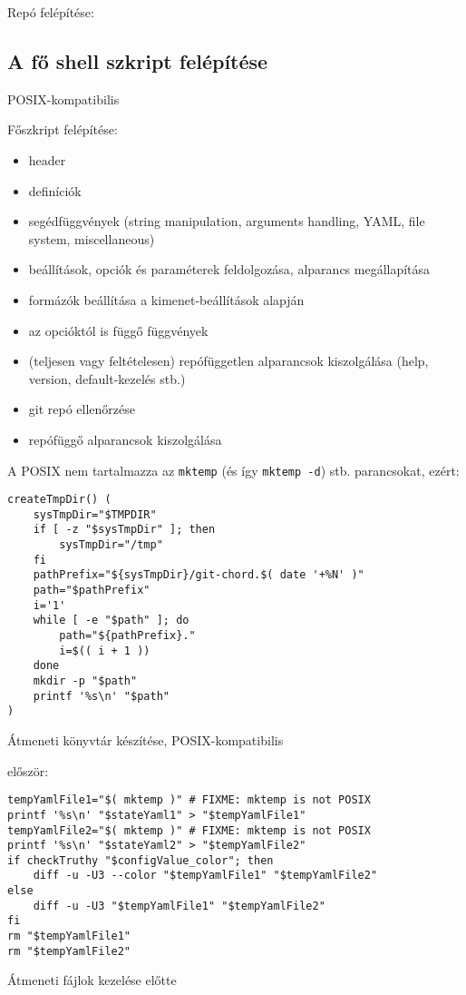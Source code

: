\documentclass[final]{elteikthesis}[2025/03/25]
\begin{document}
Repó felépítése:


\subsection{A fő shell szkript felépítése}

POSIX-kompatibilis

Főszkript felépítése:

\begin{itemize}
    \item header
    \item definíciók
    \item segédfüggvények (string manipulation, arguments handling, YAML, file system, miscellaneous)
    \item beállítások, opciók és paraméterek feldolgozása, alparancs megállapítása
    \item formázók beállítása a kimenet-beállítások alapján
    \item az opcióktól is függő függvények
    \item (teljesen vagy feltételesen) repófüggetlen alparancsok kiszolgálása (help, version, default-kezelés stb.)
    \item git repó ellenőrzése
    \item repófüggő alparancsok kiszolgálása
\end{itemize}

A POSIX nem tartalmazza az \texttt{mktemp} (és így \texttt{mktemp -d}) stb. parancsokat, ezért:

\begin{listing}[H]
\begin{verbatim}
createTmpDir() (
    sysTmpDir="$TMPDIR"
    if [ -z "$sysTmpDir" ]; then
        sysTmpDir="/tmp"
    fi
    pathPrefix="${sysTmpDir}/git-chord.$( date '+%N' )"
    path="$pathPrefix"
    i='1'
    while [ -e "$path" ]; do
        path="${pathPrefix}."
        i=$(( i + 1 ))
    done
    mkdir -p "$path"
    printf '%s\n' "$path"
)
\end{verbatim}
\caption{Átmeneti könyvtár készítése, POSIX-kompatibilis}
\end{listing}

először:

\begin{listing}[H]
\begin{verbatim}
tempYamlFile1="$( mktemp )" # FIXME: mktemp is not POSIX
printf '%s\n' "$stateYaml1" > "$tempYamlFile1"
tempYamlFile2="$( mktemp )" # FIXME: mktemp is not POSIX
printf '%s\n' "$stateYaml2" > "$tempYamlFile2"
if checkTruthy "$configValue_color"; then
    diff -u -U3 --color "$tempYamlFile1" "$tempYamlFile2"
else
    diff -u -U3 "$tempYamlFile1" "$tempYamlFile2"
fi
rm "$tempYamlFile1"
rm "$tempYamlFile2"
\end{verbatim}
\caption{Átmeneti fájlok kezelése előtte}
\end{listing}
\end{document}
